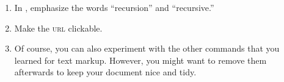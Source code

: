 \begin{enumerate}
  \item In , emphasize the words 
  ``recursion'' and ``recursive.''
  \item Make the \textsc{url} clickable. 
  \item Of course, you can also experiment with the other commands that you learned for text markup. However, you might want to remove them afterwards to keep your document nice and tidy.
\end{enumerate}



